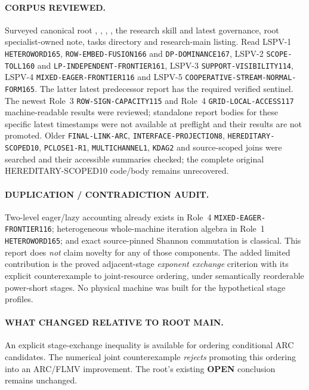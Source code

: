 \documentclass[11pt]{article}
\newcommand{\OPEN}{\textbf{OPEN}}
\begin{document}
\paragraph{CORPUS REVIEWED.}
Surveyed canonical root , ,
, , the research skill and latest governance,
root specialist-owned note, tasks directory and research-main listing.
Read LSPV-1 \texttt{HETEROWORD165}, \texttt{ROW-EMBED-FUSION166}
and \texttt{DP-DOMINANCE167}, LSPV-2 \texttt{SCOPE-TOLL160} and
\texttt{LP-INDEPENDENT-FRONTIER161}, LSPV-3
\texttt{SUPPORT-VISIBILITY114}, LSPV-4
\texttt{MIXED-EAGER-FRONTIER116} and LSPV-5
\texttt{COOPERATIVE-STREAM-NORMAL-FORM165}. The latter latest
predecessor report has the required verified sentinel. The newest
Role~3 \texttt{ROW-SIGN-CAPACITY115} and Role~4
\texttt{GRID-LOCAL-ACCESS117} machine-readable results were reviewed;
standalone report bodies for these specific latest timestamps were not
available at preflight and their results are not promoted.
Older \texttt{FINAL-LINK-ARC}, \texttt{INTERFACE-PROJECTION8},
\texttt{HEREDITARY-SCOPED10}, \texttt{PCLOSE1-R1},
\texttt{MULTICHANNEL1}, \texttt{KDAG2} and source-scoped joins were
searched and their accessible summaries checked; the complete original
HEREDITARY-SCOPED10 code/body remains unrecovered.

\paragraph{DUPLICATION / CONTRADICTION AUDIT.}
Two-level eager/lazy accounting already exists in Role~4
\texttt{MIXED-EAGER-FRONTIER116}; heterogeneous whole-machine iteration
algebra in Role~1 \texttt{HETEROWORD165}; and exact source-pinned
Shannon commutation is classical. This report does \emph{not} claim
novelty for any of those components. The added limited contribution
is the proved adjacent-stage \emph{exponent exchange} criterion with
its explicit counterexample to joint-resource ordering, under
semantically reorderable power-short stages. No physical machine was
built for the hypothetical stage profiles.

\paragraph{WHAT CHANGED RELATIVE TO ROOT MAIN.}
An explicit stage-exchange inequality is available for ordering
conditional ARC candidates. The numerical joint counterexample
\emph{rejects} promoting this ordering into an ARC/FLMV improvement.
The root's existing \OPEN{} conclusion remains unchanged.
\end{document}
